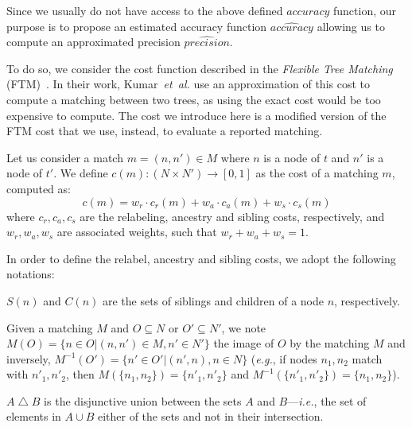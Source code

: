 \documentclass{vldb}
\begin{document}
Since we usually do not have access to the above defined $accuracy$ function, our purpose is to propose an estimated accuracy function $\hat{accuracy}$ allowing us to compute an approximated precision $\hat{precision}$.

To do so, we consider the cost function described in the \emph{Flexible Tree Matching} (FTM)~\cite{Kumar2011_FTM}.
In their work, Kumar~\emph{et~al.} use an approximation of this cost to compute a matching between two trees, as using the exact cost would be too expensive to compute. 
The cost we introduce here is a modified version of the FTM cost that we use, instead, to evaluate a reported matching.

Let us consider a match $m=(n, n') \in M$ where $n$ is a node of $t$ and $n'$ is a node of $t'$.
We define $c(m):(N \times N') \to [0, 1]$ as the cost of a matching $m$, computed as:
\begin{equation}\label{eq:FTM_cost}
    c(m) = w_r \cdot c_r(m) + w_a \cdot c_a(m) + w_s \cdot c_s(m)
\end{equation} 
where $c_r, c_a, c_s$ are the relabeling, ancestry and sibling costs, respectively, and $w_r, w_a, w_s$ are associated weights, such that $w_r + w_a + w_s = 1$.

In order to define the relabel, ancestry and sibling costs, we adopt the following notations:
\begin{compactitem}
\item $S(n)$ and $C(n)$ are the sets of siblings and children of a node $n$, respectively.

\item Given a matching $M$ and $O \subseteq N$ or $O'\subseteq N'$, we note $M(O) = \{n \in O | (n, n') \in M, n' \in N'\}$ the image of $O$ by the matching $M$ and inversely, $M^{-1}(O') = \{n' \in O' | (n',n), n \in N\}$ (\emph{e.g.}, if nodes $n_1, n_2$ match with $n'_1, n'_2$, then $M(\{n_1, n_2\}) = \{n'_1, n'_2\}$ and $M^{-1}(\{n'_1, n'_2\}) = \{n_1, n_2\}$).

\item $A \bigtriangleup B$ is the disjunctive union between the sets $A$ and $B$---\emph{i.e.}, the set of elements in $A \cup B$ either of the sets and not in their intersection.

\end{compactitem}
\end{document}
